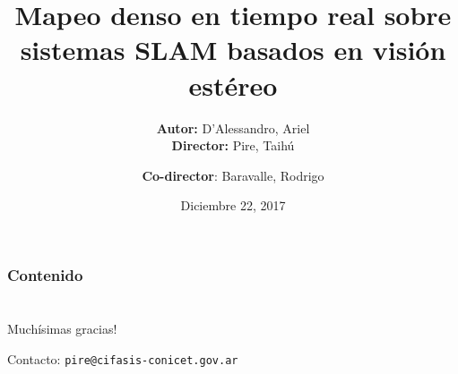 \documentclass[compress]{beamer}
\author{\textbf{Autor:} D'Alessandro, Ariel \\ \textbf{Director:} Pire, Taihú \and \textbf{Co-director}: Baravalle, Rodrigo}
\title{Mapeo denso en tiempo real sobre sistemas SLAM basados en visión estéreo}
\institute{FCEIA - UNR}
\date{\scriptsize{Diciembre 22, 2017}}
\begin{document}
\frame{\titlepage}

\begin{frame}
\frametitle{Contenido}
\tableofcontents
\end{frame}











\section*{}

\begin{frame}
	\centering
	\Large{Muchísimas gracias!}
	
	
	\vspace{2cm}
	Contacto: {\tt pire@cifasis-conicet.gov.ar}
\end{frame}
\end{document}
